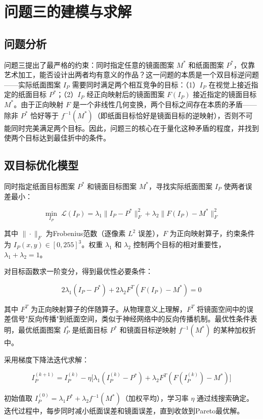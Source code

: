 \section{问题三的建模与求解}

\subsection{问题分析}

问题三提出了最严格的约束：同时指定任意的镜面图案 $M^*$ 和纸面图案 $P^*$，仅靠艺术加工，能否设计出两者均有意义的作品？这一问题的本质是一个双目标逆问题——实际纸面图案 $I_P$ 需要同时满足两个相互竞争的目标：（1）$I_P$ 在视觉上接近指定的纸面目标 $P^*$；（2）$I_P$ 经正向映射后的镜面图案 $F(I_P)$ 接近指定的镜面目标 $M^*$。由于正向映射 $F$ 是一个非线性几何变换，两个目标之间存在本质的矛盾——除非 $P^*$ 恰好等于 $f^{-1}(M^*)$（即纸面目标恰好是镜面目标的逆映射），否则不可能同时完美满足两个目标。因此，问题三的核心在于量化这种矛盾的程度，并找到使两个目标达到最佳折中的条件。

\subsection{双目标优化模型}

同时指定纸面目标图案 $P^*$ 和镜面目标图案 $M^*$，寻找实际纸面图案 $I_P$ 使两者误差最小：

$$
\min_{I_P} \; \mathcal{L}(I_P) = \lambda_1 \|I_P - P^*\|_F^2 + \lambda_2 \|F(I_P) - M^*\|_F^2
$$

其中 $\|\cdot\|_F$ 为Frobenius范数（逐像素 $L^2$ 误差），$F$ 为正向映射算子，约束条件为 $I_P(x,y) \in [0,255]^3$。权重 $\lambda_1$ 和 $\lambda_2$ 控制两个目标的相对重要性，$\lambda_1 + \lambda_2 = 1$。

对目标函数求一阶变分，得到最优性必要条件：

$$
2\lambda_1 (I_P - P^*) + 2\lambda_2 F^T(F(I_P) - M^*) = 0
$$

其中 $F^T$ 为正向映射算子的伴随算子。从物理意义上理解，$F^T$ 将镜面空间中的误差信号"反向传播"到纸面空间，类似于神经网络中的反向传播机制。最优性条件表明，最优纸面图案 $I_P^*$ 是纸面目标 $P^*$ 和镜面目标逆映射 $f^{-1}(M^*)$ 的某种加权折中。

采用梯度下降法迭代求解：

$$
I_P^{(k+1)} = I_P^{(k)} - \eta \bigl[\lambda_1(I_P^{(k)} - P^*) + \lambda_2 F^T(F(I_P^{(k)}) - M^*)\bigr]
$$

初始值取 $I_P^{(0)} = \lambda_1 P^* + \lambda_2 f^{-1}(M^*)$（加权平均），学习率 $\eta$ 通过线搜索确定。迭代过程中，每步同时减小纸面误差和镜面误差，直到收敛到Pareto最优解。

